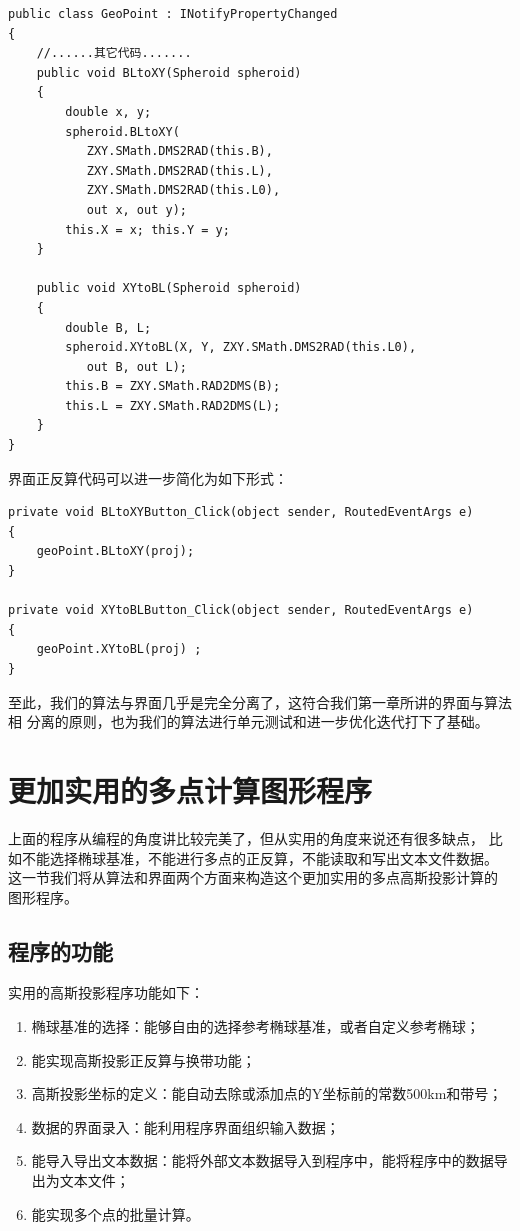 \begin{lstlisting}
public class GeoPoint : INotifyPropertyChanged
{
    //......其它代码.......
    public void BLtoXY(Spheroid spheroid)
    {
        double x, y;
        spheroid.BLtoXY(
           ZXY.SMath.DMS2RAD(this.B),
           ZXY.SMath.DMS2RAD(this.L),
           ZXY.SMath.DMS2RAD(this.L0),
           out x, out y);
        this.X = x; this.Y = y;
    }

    public void XYtoBL(Spheroid spheroid)
    {
        double B, L;
        spheroid.XYtoBL(X, Y, ZXY.SMath.DMS2RAD(this.L0),
           out B, out L);
        this.B = ZXY.SMath.RAD2DMS(B);
        this.L = ZXY.SMath.RAD2DMS(L);
    }
}
\end{lstlisting}

界面正反算代码可以进一步简化为如下形式：

\begin{lstlisting}
private void BLtoXYButton_Click(object sender, RoutedEventArgs e)
{
    geoPoint.BLtoXY(proj);
}

private void XYtoBLButton_Click(object sender, RoutedEventArgs e)
{
    geoPoint.XYtoBL(proj) ;
}
\end{lstlisting}

至此，我们的算法与界面几乎是完全分离了，这符合我们第一章所讲的界面与算法相
分离的原则，也为我们的算法进行单元测试和进一步优化迭代打下了基础。


\section{更加实用的多点计算图形程序}

上面的程序从编程的角度讲比较完美了，但从实用的角度来说还有很多缺点，
比如不能选择椭球基准，不能进行多点的正反算，不能读取和写出文本文件数据。
这一节我们将从算法和界面两个方面来构造这个更加实用的多点高斯投影计算的
图形程序。

\subsection{程序的功能}

实用的高斯投影程序功能如下：

\begin{enumerate}
\item 椭球基准的选择：能够自由的选择参考椭球基准，或者自定义参考椭球；
\item 能实现高斯投影正反算与换带功能；
\item 高斯投影坐标的定义：能自动去除或添加点的Y坐标前的常数500km和带号；
\item 数据的界面录入：能利用程序界面组织输入数据；
\item 能导入导出文本数据：能将外部文本数据导入到程序中，能将程序中的数据导出为文本文件；
\item 能实现多个点的批量计算。
\end{enumerate}

